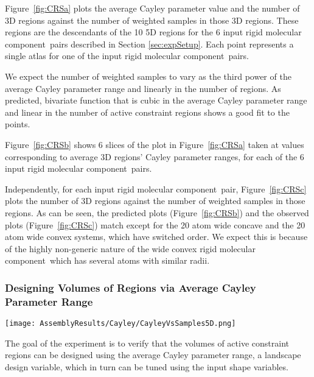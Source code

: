 \documentclass[]{article}
\newcommand{\figref}[1]{Figure~\ref{#1}}
\newcommand{\rmc}{rigid molecular component}
\newcommand{\rahul}[1]{\color{black}{#1}\color{black}}
\begin{document}
\figref{fig:CRSa} plots the average Cayley parameter value and the number of 3D
regions against the number of weighted samples in those 3D regions. These
regions are the descendants of the 10 5D regions for the 6 input \rmc\ pairs
described in Section \ref{sec:expSetup}. Each point represents a single atlas
for one of the input \rmc\ pairs.

We expect the number of weighted samples to vary as the third power of the
average Cayley parameter range and linearly in the number of regions. As
predicted, \rahul{a } bivariate function that is cubic in the average Cayley parameter
range and linear in the number of active constraint regions shows a good fit to
the points.

\figref{fig:CRSb} shows 6 slices of the plot in \figref{fig:CRSa} taken at values 
corresponding to average 3D regions' Cayley parameter ranges, for each of the
6 input \rmc\ pairs.


Independently, for each input \rmc\ pair, \figref{fig:CRSc} plots the number
of 3D regions against the number of weighted samples in those regions.
As can be seen, the predicted plots (\figref{fig:CRSb}) and the
observed plots (\figref{fig:CRSc}) match except for the 20 atom wide concave and the
20 atom wide convex systems, which have switched order. We expect this is because
of the highly non-generic nature of the wide convex \rmc\ which has several
atoms with similar radii.

\subsubsection{Designing Volumes of Regions via Average Cayley Parameter Range}
\label{sec:results:DesignVolume}
\begin{figure*}[htpb]
\centering
\texttt{[image: AssemblyResults/Cayley/CayleyVsSamples5D.png]}
\caption{\scriptsize \textbf{Effect of the Average Cayley Parameter Range on Volume}: 
Each point of a single color represents one of the 10, 5D active constraint 
regions; each color represents one of the six input molecular pairs shown in
\figref{fig:inputMolecules}.
Trend lines fit a $5^{th}$-degree polynomial curve
(see text in Section \ref{sec:results:DesignVolume}).
}
\label{fig:CayleyVsSamples}
\end{figure*}
The goal of the experiment is to verify that the volumes of active constraint
regions can be designed using the average Cayley parameter range, a landscape
design variable, which in turn can be tuned using the input shape variables.
\end{document}
